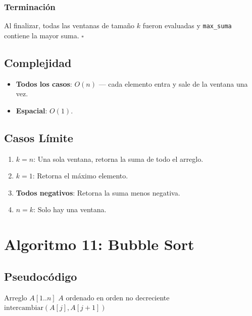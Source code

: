 \documentclass[11pt,a4paper]{article}
\begin{document}
\subsubsection{Terminación}
Al finalizar, todas las ventanas de tamaño $k$ fueron evaluadas y \texttt{max\_suma} contiene la mayor suma. $\square$

\subsection{Complejidad}
\begin{itemize}
    \item \textbf{Todos los casos}: $O(n)$ --- cada elemento entra y sale de la ventana una vez.
    \item \textbf{Espacial}: $O(1)$.
\end{itemize}

\subsection{Casos Límite}
\begin{enumerate}
    \item \textbf{$k = n$}: Una sola ventana, retorna la suma de todo el arreglo.
    \item \textbf{$k = 1$}: Retorna el máximo elemento.
    \item \textbf{Todos negativos}: Retorna la suma menos negativa.
    \item \textbf{$n = k$}: Solo hay una ventana.
\end{enumerate}

\newpage

\section{Algoritmo 11: Bubble Sort}

\subsection{Pseudocódigo}
\begin{algorithm}[H]
\caption{Bubble Sort}
\begin{algorithmic}[1]
\Require Arreglo $A[1..n]$
\Ensure $A$ ordenado en orden no decreciente
            \State $\text{intercambiar}(A[j], A[j+1])$
        \EndIf
    \EndFor
\EndFor
\end{algorithmic}
\end{algorithm}
\end{document}

